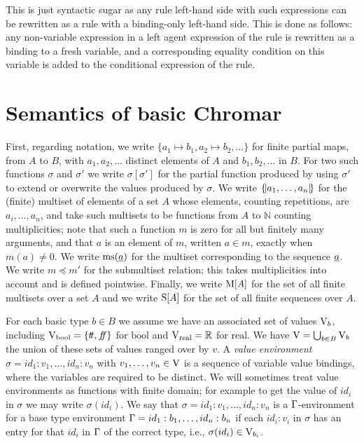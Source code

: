 This is just syntactic sugar as any rule left-hand side with such expressions
can be rewritten as a rule with a binding-only left-hand side.  This is done as
follows: any non-variable expression in a left agent expression of the rule is
rewritten as a binding to a fresh variable, and a corresponding equality
condition on this variable is added to the conditional expression of the rule.

\section{Semantics of basic Chromar}\label{sec:semantics}
First, regarding notation, we write
$\{ a_1 \mapsto b_1, a_2 \mapsto b_2, \dots \}$ for finite partial maps, from
$A$ to $B$, with $a_1, a_2, \dots$ distinct elements of $A$ and
$b_1, b_2, \dots$ in $B$. For two such functions $\sigma$ and $\sigma'$ we write
$\sigma[\sigma']$ for the partial function produced by using $\sigma'$ to extend or overwrite
the values produced by $\sigma$.
%
We write $\{\!| a_1, \dots, a_n |\!\}$ for the (finite) multiset of elements of a set
$A$ whose elements, counting repetitions, are $a_i, \ldots, a_n$, and take such
multisets to be functions from $A$ to $\mathbb{N}$ counting multiplicities; note
that such a function $m$ is zero for all but finitely many arguments, and that
$a$ is an element of $m$, written $a \in m$, exactly when $m(a) \neq 0$. We write
$\mathrm{ms}(\underline{a})$ for the multiset corresponding to the sequence $\underline{a}$. We write
$m \preceq m'$ for the submultiset relation; this takes multiplicities into account
and is defined pointwise. Finally, we write $\mathrm{M}[A]$ for the set of all finite
multisets over a set $A$ and we write $\mathrm{S}[A]$ for the set of all finite
sequences over $A$.


For each basic type $b \in B$ we assume we have an associated set of values
$\mathrm{V}_b$, including $\mathrm{V}_{\mathrm{bool}} = \{t\!t, f\!\!f\} $ for $\mathrm{bool}$
and $\mathrm{V}_{\mathrm{real}} = \mathbb{R}$ for $\mathrm{real}$. We have
$\mathrm{V}=\bigcup_{b \in B} \mathrm{V}_b$ the union of these sets of values ranged over by
$v$. A \emph{value environment} $\sigma = id_1: v_1, \dots, id_n: v_n$ with
$v_1, \dots, v_n \in \mathrm{V}$ is a sequence of variable value bindings, where the
variables are required to be distinct.  We will sometimes treat value
environments as functions with finite domain; for example to get the value of
$id_i$ in $\sigma$ we may write $\sigma(id_i)$. We say that
$\sigma= id_1:v_1, \dots, id_n:v_n$ is a $\Gamma$-environment for a base type environment
$\Gamma= id_1:b_1, \dots, id_n:b_n$ if each $id_i:v_i$ in $\sigma$ has an entry for that
$id_i$ in $\Gamma$ of the correct type, i.e., $\sigma(id_i) \in \mathrm{V}_{b_i}$.

